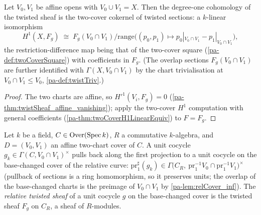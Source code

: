 \begin{definition}
  \label{pa-def:twistTwoCoverH1}
  \leanok

  Let \(V_0, V_1\) be affine opens with \(V_0 \cup V_1 = X\). Then the degree-one
  cohomology of the twisted sheaf is the two-cover cokernel of twisted sections: a
  \(k\)-linear isomorphism
  \[
    H^1(X, F_g) \;\cong\;
      F_g(V_0 \cap V_1) \big/ \mathrm{range}\bigl((p_0, p_1) \mapsto
        p_0|_{V_0 \cap V_1} - p_1|_{V_0 \cap V_1}\bigr),
  \]
  the restriction-difference map being that of the two-cover square
  (\ref{pa-def:twoCoverSquare}) with coefficients in \(F_g\). (The overlap sections
  \(F_g(V_0 \cap V_1)\) are further identified with \(\Gamma(X, V_0 \cap V_1)\) by the
  chart trivialisation at \(V_0 \cap V_1 \le V_0\), \ref{pa-def:twistTriv}.)
\end{definition}
\begin{proof}
  \leanok
  The two charts are affine, so \(H'^1(V_i, F_g) = 0\)
  (\ref{pa-thm:twistSheaf_affine_vanishing}); apply the two-cover \(H^1\) computation with
  general coefficients (\ref{pa-thm:twoCoverH1LinearEquiv}) to \(F = F_g\).
\end{proof}

\begin{definition}
  \label{pa-def:relTwistSheaf}
  \leanok

  Let \(k\) be a field, \(C \in \mathrm{Over}(\operatorname{Spec} k)\), \(R\) a commutative \(k\)-algebra, and
  \(D = (V_0, V_1)\) an affine two-chart cover of \(C\). A unit cocycle
  \(g_k \in \Gamma(C, V_0 \cap V_1)^{\times}\) pulls back along the first projection to a
  unit cocycle on the base-changed cover of the relative curve:
  \(\mathrm{pr}_1^{\sharp}(g_k) \in
  \Gamma\bigl(C_R,\ \mathrm{pr}_1^{-1}V_0 \cap \mathrm{pr}_1^{-1}V_1\bigr)^{\times}\)
  (pullback of sections is a ring homomorphism, so it preserves units; the overlap of the
  base-changed charts is the preimage of \(V_0 \cap V_1\) by \ref{pa-lem:relCover_inf}). The
  \emph{relative twisted sheaf} of a unit cocycle \(g\) on the base-changed cover is the
  twisted sheaf \(F_g\) on \(C_R\), a sheaf of \(R\)-modules.
\end{definition}

